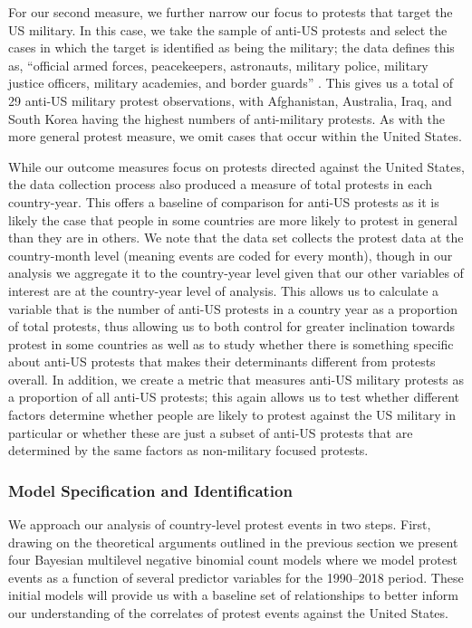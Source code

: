 For our second measure, we further narrow our focus to protests that target the US military. In this case, we take the sample of anti-US protests and select the cases in which the target is identified as being the military; the data defines this as, ``official armed forces, peacekeepers, astronauts, military police, military justice officers, military academies, and border guards'' \cite{Bond2003}. This gives us a total of 29 anti-US military protest observations, with Afghanistan, Australia, Iraq, and South Korea having the highest numbers of anti-military protests. As with the more general protest measure, we omit cases that occur within the United States.

While our outcome measures focus on protests directed against the United States, the data collection process also produced a measure of total protests in each country-year. This offers a baseline of comparison for anti-US protests as it is likely the case that people in some countries are more likely to protest in general than they are in others. We note that the data set collects the protest data at the country-month level (meaning events are coded for every month), though in our analysis we aggregate it to the country-year level given that our other variables of interest are at the country-year level of analysis.  This allows us to calculate a variable that is the number of anti-US protests in a country year as a proportion of total protests, thus allowing us to both control for greater inclination towards protest in some countries as well as to study whether there is something specific about anti-US protests that makes their determinants different from protests overall. In addition, we create a metric that measures anti-US military protests as a proportion of all anti-US protests; this again allows us to test whether different factors determine whether people are likely to protest against the US military in particular or whether these are just a subset of anti-US protests that are determined by the same factors as non-military focused protests.           


\subsubsection*{Model Specification and Identification}


We approach our analysis of country-level protest events in two steps. First, drawing on the theoretical arguments outlined in the previous section we present four Bayesian multilevel negative binomial count models where we model protest events as a function of several predictor variables for the 1990--2018 period. These initial models will provide us with a baseline set of relationships to better inform our understanding of the correlates of protest events against the United States. 

